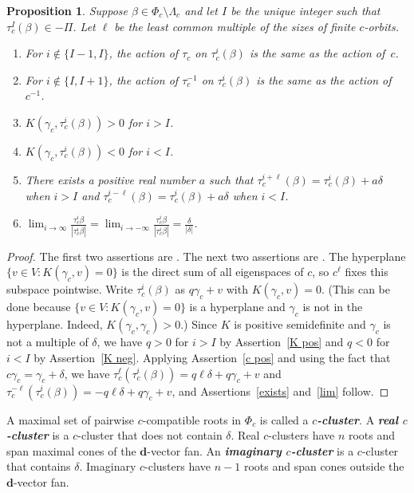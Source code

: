 \documentclass[10pt]{article}
\newtheorem{proposition}{Proposition}[section]
\theoremstyle{definition}
\theoremstyle{remark}
\numberwithin{equation}{section}
\newcommand{\newword}[1]{\textbf{\emph{#1}}}
\newcommand{\set}[1]{{\lbrace #1 \rbrace}}
\newcommand{\0}{{\mathbf{0}}}
\newcommand{\dd}{{\mathbf d}}
\newcommand{\RSChar}{\Phi}
\newcommand{\RS}{\RSChar}
\newcommand{\SimplesChar}{\Pi}
\newcommand{\Simples}{\SimplesChar}
\newcommand{\AP}[1]{\RS_{#1}}
\newcommand{\APTChar}{\Lambda}
\newcommand{\APT}[1]{\APTChar_{#1}}
\begin{document}
\begin{proposition}\label{delta limit}
Suppose $\beta\in\AP{c}\setminus\APT{c}$ and let $I$ be the unique integer such that $\tau_c^I(\beta)\in-\Simples$.
Let $\ell$ be the least common multiple of the sizes of finite $c$-orbits.
\begin{enumerate}[label=\bf\arabic*., ref=\arabic*]
\item \label{c pos}
For $i\not\in\set{I-1,I}$, the action of $\tau_c$ on $\tau_c^i(\beta)$ is the same as the action of~$c$.
\item \label{c neg}
For $i\not\in\set{I,I+1}$, the action of $\tau_c^{-1}$ on $\tau_c^i(\beta)$ is the same as the action of~$c^{-1}$.
\item \label{K pos}
$K(\gamma_c,\tau_c^i(\beta))>0$ for $i>I$.
\item \label{K neg}
$K(\gamma_c,\tau_c^i(\beta))<0$ for $i<I$.
\item \label{exists}
There exists a positive real number $a$ such that $\tau_c^{i+\ell}(\beta)=\tau_c^i(\beta)+a\delta$ when $i>I$ and $\tau_c^{i-\ell}(\beta)=\tau_c^i(\beta)+a\delta$ when $i<I$.
\item \label{lim}
$\displaystyle\lim_{i\to\infty}\frac{\tau_c^i\beta}{|\tau_c^i\beta|}=\lim_{i\to-\infty}\frac{\tau_c^i\beta}{|\tau_c^i\beta|}=\frac{\delta}{|\delta|}$.
\end{enumerate}
\end{proposition}

\begin{proof}
The first two assertions are \cite[Proposition~3.12(2)]{affdenom}.
The next two assertions are \cite[Proposition~3.12(8)]{affdenom}.
The hyperplane $\set{v\in V:K(\gamma_c,v)=0}$ is the direct sum of all eigenspaces of $c$, so $c^\ell$ fixes this subspace pointwise.
Write $\tau_c^i(\beta)$ as $q\gamma_c+v$ with $K(\gamma_c,v)=0$. 
(This can be done because $\set{v\in V:K(\gamma_c,v)=0}$ is a hyperplane and $\gamma_c$ is not in the hyperplane.  
Indeed, $K(\gamma_c,\gamma_c)>0$.)
Since $K$ is positive semidefinite and $\gamma_c$ is not a multiple of $\delta$, we have $q>0$ for $i>I$ by Assertion~\ref{K pos} and $q<0$ for $i<I$ by Assertion~\ref{K neg}.
Applying Assertion~\ref{c pos} and using the fact that $c\gamma_c=\gamma_c+\delta$, we have $\tau_c^\ell(\tau_c^i(\beta))=q\ell\delta+q\gamma_c+v$ and $\tau_c^{-\ell}(\tau_c^i(\beta))=-q\ell\delta+q\gamma_c+v$, and Assertions~\ref{exists} and~\ref{lim} follow.
\end{proof}

A maximal set of pairwise $c$-compatible roots in $\AP{c}$ is called a \newword{$c$-cluster}.
A \newword{real $c$-cluster} is a $c$-cluster that does not contain $\delta$.
Real $c$-clusters have $n$ roots and span maximal cones of the $\dd$-vector fan.
An \newword{imaginary $c$-cluster} is a $c$-cluster that contains $\delta$.
Imaginary $c$-clusters have $n-1$ roots and span cones outside the $\dd$-vector fan.
\end{document}
